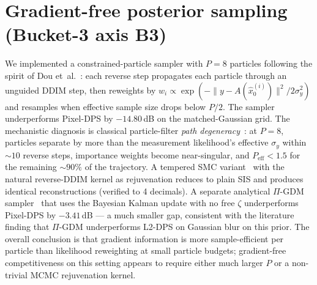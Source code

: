 \documentclass{article}
\begin{document}
\section{Gradient-free posterior sampling (Bucket-3 axis B3)}
\label{app:gradfree}

We implemented a constrained-particle sampler with $P=8$ particles
following the spirit of Dou et~al.~\citep{dou2026particle}: each
reverse step propagates each particle through an unguided DDIM step,
then reweights by
$w_i \propto \exp(-\|y - A(\hat x_0^{(i)})\|^2 / 2\sigma_y^2)$
and resamples when effective sample size drops below $P/2$. The
sampler underperforms Pixel-DPS by $-14.80$\,dB on the matched-Gaussian
grid. The mechanistic diagnosis is classical particle-filter \emph{path
degeneracy}~\citep{doucet2001smc}: at $P=8$, particles separate by
more than the measurement likelihood's effective $\sigma_y$ within
$\sim 10$ reverse steps, importance weights become near-singular, and
$P_{\text{eff}} < 1.5$ for the remaining $\sim 90\%$ of the trajectory.
A tempered SMC variant~\citep{delmoral2006smc} with the natural
reverse-DDIM kernel as rejuvenation reduces to plain SIS and produces
identical reconstructions (verified to 4 decimals). A separate
analytical $\Pi$-GDM sampler~\citep{song2023pigdm} that uses the
Bayesian Kalman update with no free $\zeta$ underperforms Pixel-DPS by
$-3.41$\,dB --- a much smaller gap, consistent with the literature
finding that $\Pi$-GDM underperforms L2-DPS on Gaussian blur on this
prior. The overall conclusion is that gradient information is more
sample-efficient per particle than likelihood reweighting at small
particle budgets; gradient-free competitiveness on this setting
appears to require either much larger $P$ or a non-trivial MCMC
rejuvenation kernel.
\end{document}
